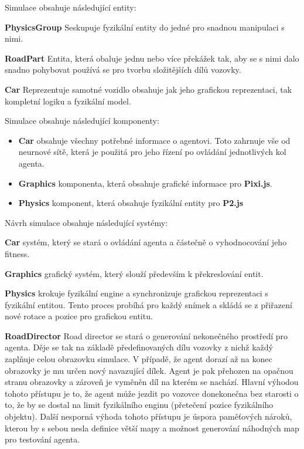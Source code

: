 Simulace obsahuje následující entity:

\textbf{PhysicsGroup} Seskupuje fyzikální entity do jedné pro snadnou manipulaci s nimi.

\textbf{RoadPart} Entita, která obaluje jednu nebo více překážek tak, aby se s nimi dalo snadno pohybovat používá se pro tvorbu složitějších dílů vozovky.

\textbf{Car} Reprezentuje samotné vozidlo obsahuje jak jeho grafickou reprezentaci, tak kompletní logiku a fyzikální model.

Simulace obsahuje následující komponenty:
\begin{itemize}
	\item \textbf{Car} obsahuje všechny potřebné informace o agentovi. Toto zahrnuje vše od neurnové sítě, která je použitá pro jeho řízení po ovládání jednotlivých kol agenta.
	\item \textbf{Graphics} komponenta, která obsahuje grafické informace pro \textbf{Pixi.js}.
	\item \textbf{Physics} komponent, která obsahuje fyzikální entity pro \textbf{P2.js}
\end{itemize}

Návrh simulace obsahuje následující systémy:

\textbf{Car} systém, který se stará o ovládání agenta a částečně o vyhodnocování jeho fitness.

\textbf{Graphics} grafický systém, který slouží především k překreslování entit.

\textbf{Physics} krokuje fyzikální engine a synchronizuje grafickou reprezentaci s fyzikální entitou. Tento proces probíhá pro každý snímek a skládá se z přiřazení nové rotace a pozice pro grafickou entitu.

\textbf{RoadDirector} Road director se stará o generování nekonečného prostředí pro agenta. Děje se tak na základě předefinovaných dílu vozovky z nichž každý zaplňuje celou obrazovku simulace. V případě, že agent dorazí až na konec obrazovky je mu určen nový navazující dílek. Agent je pak přehozen na opačnou stranu obrazovky a zároveň je vyměněn díl na kterém se nachází.
Hlavní výhodou tohoto přístupu je to, že agent může jezdit po vozovce donekonečna bez starosti o to, že by se dostal na limit fyzikálního enginu (přetečení pozice fyzikálního objektu). Další nesporná výhoda tohoto přístupu je úspora paměťových nároků, kterou by s sebou nesla definice větší mapy a možnost generování náhodných map pro testování agenta.

